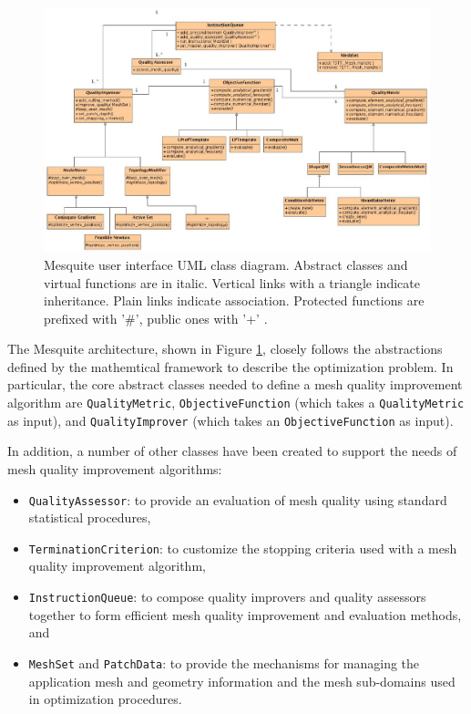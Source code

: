 \documentclass[psfig]{article}
\begin{document}
\begin{figure}[htb]
\begin{center}
    \includegraphics{../developer/UML/MesquiteUI.eps}
    \caption{Mesquite user interface UML class diagram.  Abstract
             classes and virtual functions are in italic. Vertical
             links with a triangle indicate inheritance. Plain links
             indicate association. Protected functions are prefixed
             with '\#', public ones with '+' .}
    \label{fig:uml}
\end{center}
\end{figure}

The Mesquite architecture, shown in Figure \ref{fig:uml}, closely
follows the abstractions defined by the mathemtical framework 
to describe the optimization problem.
In particular, the core abstract classes needed to
define a mesh quality improvement algorithm are {\tt QualityMetric},
{\tt ObjectiveFunction} (which takes a {\tt QualityMetric} as
input), and {\tt QualityImprover} (which takes an {\tt ObjectiveFunction}
as input).

In addition, a number of other classes have been created to support
the needs of mesh quality improvement algorithms:
\begin{itemize}
\item {\tt QualityAssessor}: to provide an evaluation of mesh
quality using standard statistical procedures,
\item {\tt TerminationCriterion}: to customize the stopping criteria
used with a mesh quality improvement algorithm,
\item {\tt InstructionQueue}: to compose quality improvers and
quality assessors together to form efficient mesh quality improvement
and evaluation methods, and
\item {\tt MeshSet} and {\tt PatchData}: to provide the mechanisms
for managing the application mesh and geometry information and the
mesh sub-domains used in optimization procedures.
\end{itemize}
\end{document}
